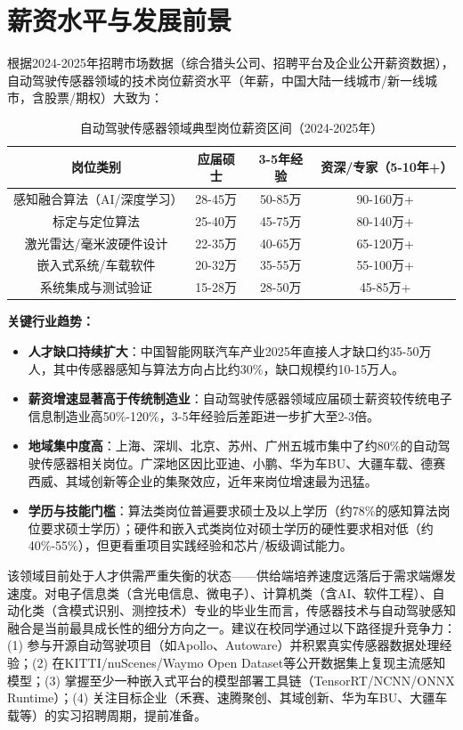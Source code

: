 \documentclass[12pt,a4paper,openany,UTF8]{ctexbook}
\begin{document}
\section{薪资水平与发展前景}

根据2024-2025年招聘市场数据（综合猎头公司、招聘平台及企业公开薪资数据），自动驾驶传感器领域的技术岗位薪资水平（年薪，中国大陆一线城市/新一线城市，含股票/期权）大致为：

\begin{table}[htbp]
\centering
\caption{自动驾驶传感器领域典型岗位薪资区间（2024-2025年）}
\label{tab:salary}
\begin{tabular}{cccc}
\toprule
\textbf{岗位类别} & \textbf{应届硕士} & \textbf{3-5年经验} & \textbf{资深/专家（5-10年+）} \\
\midrule
感知融合算法（AI/深度学习） & 28-45万 & 50-85万 & 90-160万+ \\
标定与定位算法 & 25-40万 & 45-75万 & 80-140万+ \\
激光雷达/毫米波硬件设计 & 22-35万 & 40-65万 & 65-120万+ \\
嵌入式系统/车载软件 & 20-32万 & 35-55万 & 55-100万+ \\
系统集成与测试验证 & 15-28万 & 28-50万 & 45-85万+ \\
\bottomrule
\end{tabular}
\end{table}

\vspace{-0.5em}
\textbf{关键行业趋势：}
\begin{itemize}
    \item \textbf{人才缺口持续扩大}：中国智能网联汽车产业2025年直接人才缺口约35-50万人，其中传感器感知与算法方向占比约30\%，缺口规模约10-15万人。
    \item \textbf{薪资增速显著高于传统制造业}：自动驾驶传感器领域应届硕士薪资较传统电子信息制造业高50\%-120\%，3-5年经验后差距进一步扩大至2-3倍。
    \item \textbf{地域集中度高}：上海、深圳、北京、苏州、广州五城市集中了约80\%的自动驾驶传感器相关岗位。广深地区因比亚迪、小鹏、华为车BU、大疆车载、德赛西威、其域创新等企业的集聚效应，近年来岗位增速最为迅猛。
    \item \textbf{学历与技能门槛}：算法类岗位普遍要求硕士及以上学历（约78\%的感知算法岗位要求硕士学历）；硬件和嵌入式类岗位对硕士学历的硬性要求相对低（约40\%-55\%），但更看重项目实践经验和芯片/板级调试能力。
\end{itemize}

该领域目前处于人才供需严重失衡的状态——供给端培养速度远落后于需求端爆发速度。对电子信息类（含光电信息、微电子）、计算机类（含AI、软件工程）、自动化类（含模式识别、测控技术）专业的毕业生而言，传感器技术与自动驾驶感知融合是当前最具成长性的细分方向之一。建议在校同学通过以下路径提升竞争力：(1) 参与开源自动驾驶项目（如Apollo、Autoware）并积累真实传感器数据处理经验；(2) 在KITTI/nuScenes/Waymo Open Dataset等公开数据集上复现主流感知模型；(3) 掌握至少一种嵌入式平台的模型部署工具链（TensorRT/NCNN/ONNX Runtime）；(4) 关注目标企业（禾赛、速腾聚创、其域创新、华为车BU、大疆车载等）的实习招聘周期，提前准备。
\end{document}
